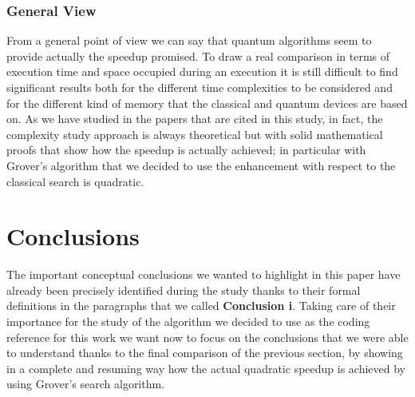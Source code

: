 \documentclass[english]{article}
\begin{document}
			\subsubsection{General View}
			\label{sec:generalViewComparison}
				From a general point of view we can say that quantum algorithms seem to provide actually the speedup promised. To draw a real comparison in terms of execution time and space occupied during an execution it is still difficult to find significant results both for the different time complexities to be considered and for the different kind of memory that the classical and quantum devices are based on. As we have studied in the papers that are cited in this study, in fact, the complexity study approach is always theoretical but with solid mathematical proofs that show how the speedup is actually achieved; in particular with Grover's algorithm that we decided to use the enhancement with respect to the classical search is quadratic. 
			
	\section{Conclusions}
	\label{sec:conclusions}
		The important conceptual conclusions we wanted to highlight in this paper have already been precisely identified during the study thanks to their formal definitions in the paragraphs that we called \textbf{Conclusion i}. Taking care of their importance for the study of the algorithm we decided to use as the coding reference for this work we want now to focus on the conclusions that we were able to understand thanks to the final comparison of the previous section, by showing in a complete and resuming way how the actual quadratic speedup is achieved by using Grover's search algorithm. \\
		
\end{document}
